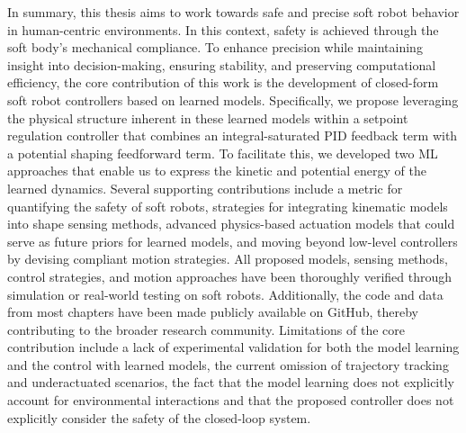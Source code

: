 In summary, this thesis aims to work towards safe and precise soft robot behavior in human-centric environments. In this context, safety is achieved through the soft body’s mechanical compliance. To enhance precision while maintaining insight into decision-making, ensuring stability, and preserving computational efficiency, the core contribution of this work is the development of closed-form soft robot controllers based on learned models. Specifically, we propose leveraging the physical structure inherent in these learned models within a setpoint regulation controller that combines an integral-saturated PID feedback term with a potential shaping feedforward term. To facilitate this, we developed two \gls{ML} approaches that enable us to express the kinetic and potential energy of the learned dynamics. Several supporting contributions include a metric for quantifying the safety of soft robots, strategies for integrating kinematic models into shape sensing methods, advanced physics-based actuation models that could serve as future priors for learned models, and moving beyond low-level controllers by devising compliant motion strategies. All proposed models, sensing methods, control strategies, and motion approaches have been thoroughly verified through simulation or real-world testing on soft robots. Additionally, the code and data from most chapters have been made publicly available on GitHub, thereby contributing to the broader research community. Limitations of the core contribution include a lack of experimental validation for both the model learning and the control with learned models, the current omission of trajectory tracking and underactuated scenarios, the fact that the model learning does not explicitly account for environmental interactions and that the proposed controller does not explicitly consider the safety of the closed-loop system.











